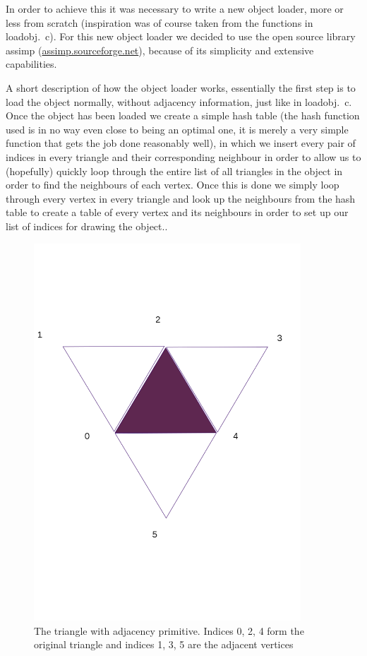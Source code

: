 \documentclass[a4paper, 12pt]{article}
\begin{document}
In order to achieve this it was necessary to write a new object loader, more or
less from scratch (inspiration was of course taken from the functions in
loadobj.~c). For this new object loader we decided to use the open source library
assimp (\url{assimp.sourceforge.net}), because of its simplicity and extensive
capabilities.

A short description of how the object loader works, essentially the first step
is to load the object normally, without adjacency information, just like in
loadobj.~c. Once the object has been loaded we create a simple hash table (the
hash function used is in no way even close to being an optimal one, it is merely
a very simple function that gets the job done reasonably well), in which we
insert every pair of indices in every triangle and their corresponding neighbour
in order to allow us to (hopefully) quickly loop through the entire list of all
triangles in the object in order to find the neighbours of each vertex. Once
this is done we simply loop through every vertex in every triangle and look up
the neighbours from the hash table to create a table of every vertex and its
neighbours in order to set up our list of indices for drawing the object..

\begin{figure}[h]
\centering
\includegraphics[width=10cm]{triangle_adj.png}
\caption{The triangle with adjacency primitive. Indices 0, 2, 4 form the
original triangle and indices 1, 3, 5 are the adjacent vertices}
\end{figure}
\end{document}
